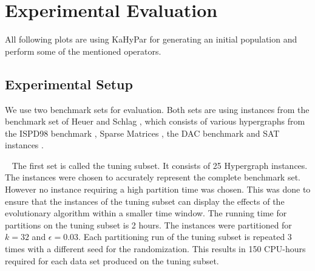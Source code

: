 \documentclass[a4paper,12pt,titlepage, BCOR7mm,headsepline]{scrbook}
\numberwithin{equation}{section}
\begin{document}
\chapter{Experimental Evaluation}

All following plots are using KaHyPar for generating an initial population and perform some of the mentioned operators.




\section{Experimental Setup}
We use two benchmark sets for evaluation. Both sets are using instances from the benchmark set of Heuer and Schlag \cite{heuer2017improving}, which consists of various hypergraphs from the ISPD98 benchmark \cite{alpert1998ispd98}, Sparse Matrices \cite{davis2011university}, the DAC benchmark \cite{viswanathan2012dac} and SAT instances \cite{belov2014proceedings}. 



\newline ~\newline
The first set is called the tuning subset. It consists of 25 Hypergraph instances. The instances were chosen to accurately represent the complete benchmark set. However no instance requiring a high partition time was chosen. This was done to ensure that the instances of the tuning subset can display the effects of the evolutionary algorithm within a smaller time window. The running time for partitions on the tuning subset is 2 hours. The instances were partitioned for $k = 32$ and $\epsilon = 0.03$. Each partitioning run of the tuning subset is repeated 3 times with a different seed for the randomization. This results in 150 CPU-hours required for each data set produced on the tuning subset.
\newline
\end{document}
